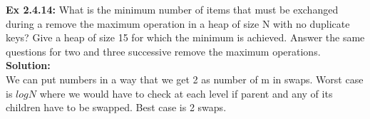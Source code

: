 \documentclass[11pt,fleqn]{article}
\begin{document}
\textbf{Ex 2.4.14:} What is the minimum number of items that must be exchanged during a remove
the maximum operation in a heap of size N with no duplicate keys? Give a heap
of size 15 for which the minimum is achieved. Answer the same questions for two and
three successive remove the maximum operations.\\
	
\textbf{Solution:}\\
We can put numbers in a way that we get 2 as number of m in swaps. Worst case is $logN$ where we would have to check at each level if parent and any of its children have to be swapped. Best case is 2 swaps.
\end{document}
